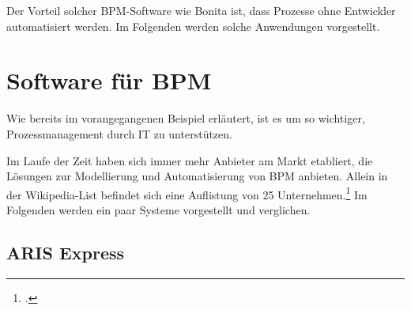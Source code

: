 Der Vorteil solcher BPM-Software wie Bonita ist, dass Prozesse ohne Entwickler
automatisiert werden.  Im Folgenden werden solche Anwendungen vorgestellt.


\clearpage
\section{Software für BPM}

Wie bereits im vorangegangenen Beispiel erläutert, ist es um so wichtiger,
Prozessmanagement durch IT zu unterstützen.

Im Laufe der Zeit haben sich immer mehr Anbieter am Markt etabliert,
die Lösungen zur Modellierung und Automatisierung von BPM anbieten. Allein in
der Wikipedia-List befindet sich eine Auflistung von 25 Unternehmen.\footcite{wikitools} Im
Folgenden werden ein paar Systeme vorgestellt und verglichen.

\subsection{ARIS Express}

\begin{figure}[H]
\begin{minipage}{\linewidth}
\begin{center}
\end{center}
\end{minipage}
\end{figure}

